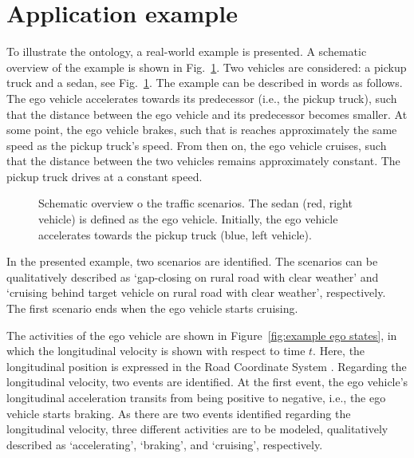 \section{Application example}
\label{sec:example}

To illustrate the ontology, a real-world example is presented. A schematic overview of the example is shown in Fig.~\ref{fig:example schematic}. Two vehicles are considered: a pickup truck and a sedan, see Fig.~\ref{fig:example schematic}. The example can be described in words as follows. The ego vehicle accelerates towards its predecessor (i.e., the pickup truck), such that the distance between the ego vehicle and its predecessor becomes smaller. At some point, the ego vehicle brakes, such that is reaches approximately the same speed as the pickup truck's speed. From then on, the ego vehicle cruises, such that the distance between the two vehicles remains approximately constant. The pickup truck drives at a constant speed.

\begin{figure}
	\centering
	\setlength\figureheight{121pt}
	\setlength\figurewidth{260pt}
	
	\caption{Schematic overview o the traffic scenarios. The sedan (red, right vehicle) is defined as the ego vehicle. Initially, the ego vehicle accelerates towards the pickup truck (blue, left vehicle).}
	\label{fig:example schematic}
\end{figure}

In the presented example, two scenarios are identified. The scenarios can be qualitatively described as `gap-closing on rural road with clear weather' and `cruising behind target vehicle on rural road with clear weather', respectively. The first scenario ends when the ego vehicle starts cruising. 

The activities of the ego vehicle are shown in Figure~\ref{fig:example ego states}, in which the longitudinal velocity is shown with respect to time $t$. Here, the longitudinal position is expressed in the Road Coordinate System \cite{zofka2015datadrivetrafficscenarios}. Regarding the longitudinal velocity, two events are identified. At the first event, the ego vehicle's longitudinal acceleration transits from being positive to negative, i.e., the ego vehicle starts braking. As there are two events identified regarding the longitudinal velocity, three different activities are to be modeled, qualitatively described as `accelerating', `braking', and `cruising', respectively. 

